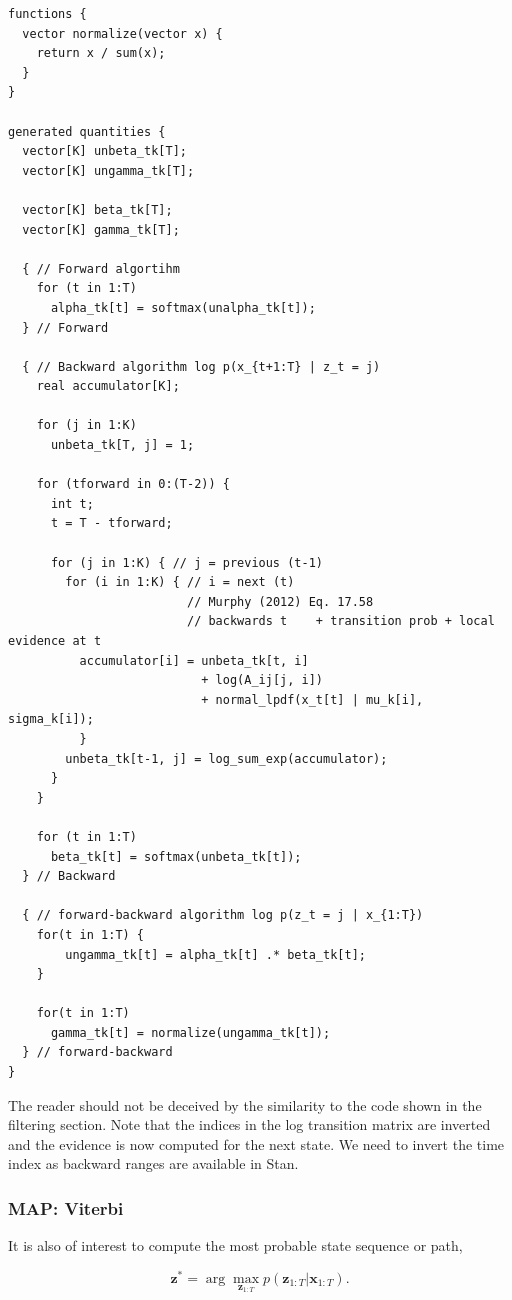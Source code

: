 \documentclass[]{article}
\newcommand{\argmax}{\arg\!\max}
\newcommand{\mat}[1]{\mathbf{#1}}
\begin{document}
\begin{verbatim}
functions {
  vector normalize(vector x) {
    return x / sum(x);
  }
}

generated quantities {
  vector[K] unbeta_tk[T];
  vector[K] ungamma_tk[T];

  vector[K] beta_tk[T];
  vector[K] gamma_tk[T];

  { // Forward algortihm
    for (t in 1:T)
      alpha_tk[t] = softmax(unalpha_tk[t]);
  } // Forward

  { // Backward algorithm log p(x_{t+1:T} | z_t = j)
    real accumulator[K];

    for (j in 1:K)
      unbeta_tk[T, j] = 1;

    for (tforward in 0:(T-2)) {
      int t;
      t = T - tforward;

      for (j in 1:K) { // j = previous (t-1)
        for (i in 1:K) { // i = next (t)
                         // Murphy (2012) Eq. 17.58
                         // backwards t    + transition prob + local evidence at t
          accumulator[i] = unbeta_tk[t, i] 
                           + log(A_ij[j, i]) 
                           + normal_lpdf(x_t[t] | mu_k[i], sigma_k[i]);
          }
        unbeta_tk[t-1, j] = log_sum_exp(accumulator);
      }
    }

    for (t in 1:T)
      beta_tk[t] = softmax(unbeta_tk[t]);
  } // Backward

  { // forward-backward algorithm log p(z_t = j | x_{1:T})
    for(t in 1:T) {
        ungamma_tk[t] = alpha_tk[t] .* beta_tk[t];
    }

    for(t in 1:T)
      gamma_tk[t] = normalize(ungamma_tk[t]);
  } // forward-backward
}
\end{verbatim}

The reader should not be deceived by the similarity to the code shown in
the filtering section. Note that the indices in the log transition
matrix are inverted and the evidence is now computed for the next state.
We need to invert the time index as backward ranges are available in
Stan.

\subsubsection{MAP: Viterbi}\label{map-viterbi}

It is also of interest to compute the most probable state sequence or
path,

\[
\mat{z}^* = \argmax_{\mat{z}_{1:T}} p(\mat{z}_{1:T} | \mat{x}_{1:T}).
\]
\end{document}
